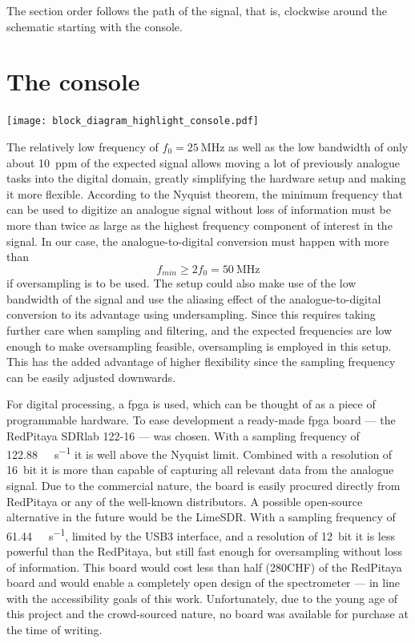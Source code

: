 The section order follows the path of the signal, that is, clockwise around the schematic starting with the console.

\section{The console}
\begin{marginfigure}[-4.5\baselineskip]
    \texttt{[image: block\_diagram\_highlight\_console.pdf]}
\end{marginfigure}

The relatively low frequency of \(f_0 = \qty{25}{\mega\hertz}\) as well as the low bandwidth of only about \qty{10}{ppm} of the expected signal allows moving a lot of previously analogue tasks into the digital domain, greatly simplifying the hardware setup and making it more flexible. According to the Nyquist theorem, the minimum frequency that can be used to digitize an analogue signal without loss of information must be more than twice as large as the highest frequency component of interest in the signal. In our case, the analogue-to-digital conversion must happen with more than
\[
    f_{min} \ge 2f_0 = \qty{50}{\mega\hertz}
\]
if oversampling is to be used. The setup could also make use of the low bandwidth of the signal and use the aliasing effect of the analogue-to-digital conversion to its advantage using undersampling. Since this requires taking further care when sampling and filtering, and the expected frequencies are low enough to make oversampling feasible, oversampling is employed in this setup. This has the added advantage of higher flexibility since the sampling frequency can be easily adjusted downwards.

For digital processing, a \acrfull{fpga} is used, which can be thought of as a piece of programmable hardware. To ease development a ready-made \acrshort{fpga} board --- the RedPitaya SDRlab 122-16 --- was chosen. With a sampling frequency of \qty{122.88}{\mega\sample\per\second} it is well above the Nyquist limit. Combined with a resolution of \qty{16}{bit} it is more than capable of capturing all relevant data from the analogue signal. Due to the commercial nature, the board is easily procured directly from RedPitaya or any of the well-known distributors. A possible open-source alternative in the future would be the LimeSDR. With a sampling frequency of \qty{61.44}{\mega\sample\per\second}, limited by the USB3 interface, and a resolution of \qty{12}{bit} it is less powerful than the RedPitaya, but still fast enough for oversampling without loss of information. This board would cost less than half (\approx 280CHF) of the RedPitaya board and would enable a completely open design of the spectrometer --- in line with the accessibility goals of this work. Unfortunately, due to the young age of this project and the crowd-sourced nature, no board was available for purchase at the time of writing.

